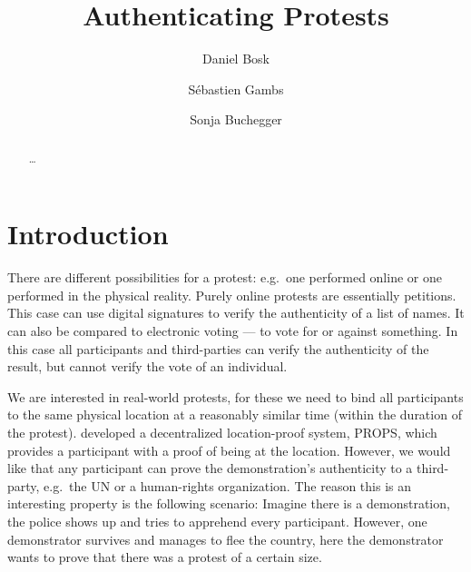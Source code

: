\title{Authenticating Protests}
\author{%
  Daniel Bosk
  \and
  Sébastien Gambs
  \and
  Sonja Buchegger
}

\maketitle

\begin{abstract}
  \dots

  \keywords{\dots}
\end{abstract}

\mode*


\section{Introduction}
\label{Introduction}

There are different possibilities for a protest: e.g.\ one performed online or 
one performed in the physical reality.
Purely online protests are essentially petitions.
This case can use digital signatures to verify the authenticity of a list of 
names.
It can also be compared to electronic voting --- to vote for or against 
something.
In this case all participants and third-parties can verify the authenticity of 
the result, but cannot verify the vote of an individual.

We are interested in real-world protests, for these we need to bind all 
participants to the same physical location at a reasonably similar time (within 
the duration of the protest).
\citeauthor{PROPS} developed a decentralized location-proof system, \ac{PROPS}, 
which provides a participant with a proof of being at the location.
However, we would like that any participant can prove the demonstration's 
authenticity to a third-party, e.g.\ the UN or a human-rights 
organization.
The reason this is an interesting property is the following scenario:
Imagine there is a demonstration, the police shows up and tries to apprehend 
every participant.
However, one demonstrator survives and manages to flee the country, here the 
demonstrator wants to prove that there was a protest of a certain size.

